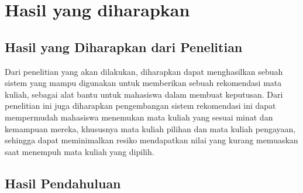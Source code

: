 \chapter{Hasil yang diharapkan}

\section{Hasil yang Diharapkan dari Penelitian}
Dari penelitian yang akan dilakukan, diharapkan dapat menghasilkan sebuah sistem yang mampu digunakan untuk
memberikan sebuah rekomendasi mata kuliah, sebagai alat bantu untuk mahasiswa dalam membuat keputusan. Dari penelitian ini juga
diharapkan pengembangan sistem rekomendasi ini dapat mempermudah mahasiswa menemukan mata kuliah yang sesuai minat dan kemampuan mereka,
khususnya mata kuliah pilihan dan mata kuliah pengayaan, sehingga dapat meminimalkan resiko mendapatkan nilai yang kurang memuaskan saat
menempuh mata kuliah yang dipilih.

\section{Hasil Pendahuluan}








